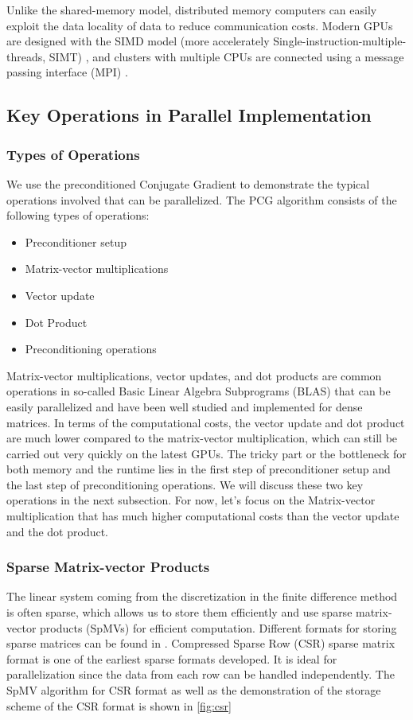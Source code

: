 Unlike the shared-memory model, distributed memory computers can easily exploit the data locality of data to reduce communication costs. Modern GPUs are designed with the SIMD model (more accelerately Single-instruction-multiple-threads, SIMT) \cite{owens2008gpu}, and clusters with multiple CPUs are connected using a message passing interface (MPI) \cite{barker2015message}.


\subsection{Key Operations in Parallel Implementation}
\subsubsection{Types of Operations}

We use the preconditioned Conjugate Gradient to demonstrate the typical operations involved that can be parallelized. The PCG algorithm consists of the following types of operations:
\begin{itemize}
    \item Preconditioner setup
    \item Matrix-vector multiplications
    \item Vector update
    \item Dot Product
    \item Preconditioning operations
\end{itemize}

Matrix-vector multiplications, vector updates, and dot products are common operations in so-called Basic Linear Algebra Subprograms (BLAS) that can be easily parallelized and have been well studied and implemented for dense matrices\cite{10.1145/77626.79170,chtchelkanova1997parallel,freeman1992parallel}. In terms of the computational costs, the vector update and dot product are much lower compared to the matrix-vector multiplication, which can still be carried out very quickly on the latest GPUs. The tricky part or the bottleneck for both memory and the runtime lies in the first step of preconditioner setup and the last step of preconditioning operations. We will discuss these two key operations in the next subsection. For now, let's focus on the Matrix-vector multiplication that has much higher computational costs than the vector update and the dot product.

\subsubsection{Sparse Matrix-vector Products}
The linear system coming from the discretization in the finite difference method is often sparse, which allows us to store them efficiently and use sparse matrix-vector products (SpMVs) for efficient computation. Different formats for storing sparse matrices can be found in \cite{saad2003iterative}. Compressed Sparse Row (CSR) sparse matrix format is one of the earliest sparse formats developed. It is ideal for parallelization since the data from each row can be handled independently. The SpMV algorithm for CSR format as well as the demonstration of the storage scheme of the CSR format is shown in \autoref{fig:csr}

